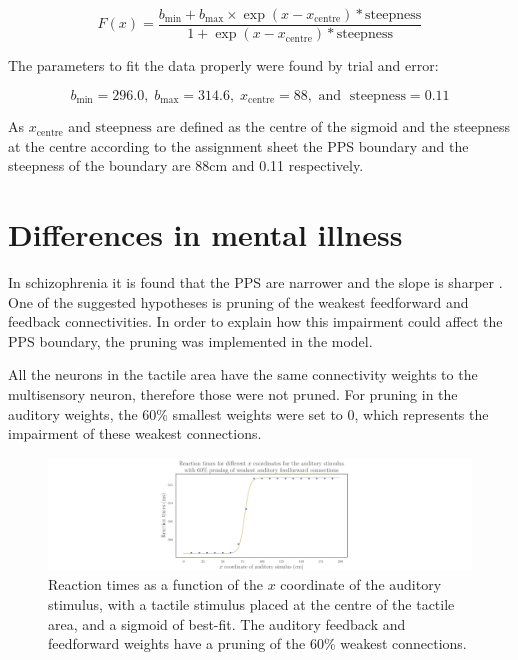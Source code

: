 \documentclass[12pt]{article}
\begin{document}
\begin{equation}
  F(x) = \frac{b_{\mathrm{min}} + b_{\mathrm{max}} \times \exp{(x - x_{\mathrm{centre}}) * \mathrm{steepness}}}{1 + \exp{(x - x_{\mathrm{centre}}) * \mathrm{steepness}}}
  \label{eq:1}
\end{equation}

The parameters to fit the data properly were found by trial and error:

\[b_{\mathrm{min}} = 296.0, \;
  b_{\mathrm{max}} = 314.6, \;
  x_{\mathrm{centre}}= 88, \text{ and } \;
  \mathrm{steepness} =  0.11\]

As $x_{\mathrm{centre}}$ and $\mathrm{steepness}$ are defined as the centre of the sigmoid and the steepness at the centre according to the assignment sheet the PPS boundary and the steepness of the boundary are 88cm and 0.11 respectively.

\section{Differences in mental illness}

In schizophrenia it is found that the PPS are narrower and the slope is sharper \cite{dicosmo}. One of the suggested hypotheses is pruning of the weakest feedforward and feedback connectivities. In order to explain how this impairment could affect the PPS boundary, the pruning was implemented in the model. 

All the neurons in the tactile area have the same connectivity weights to the multisensory neuron, therefore those were not pruned. For pruning in the auditory weights, the 60\% smallest weights were set to 0, which represents the impairment of these weakest connections. 

\begin{figure}[h!]
	\centering
	\hspace*{-1.9in}
	\includegraphics[width=1.5\linewidth]{fig/3-5.png}
	\caption{Reaction times as a function of the $x$ coordinate of the auditory stimulus, with a tactile stimulus placed at the centre of the tactile area, and a sigmoid of best-fit. The auditory feedback and feedforward weights have a pruning of the 60\% weakest connections.}
	\label{fig:3.5}
\end{figure}
\end{document}
